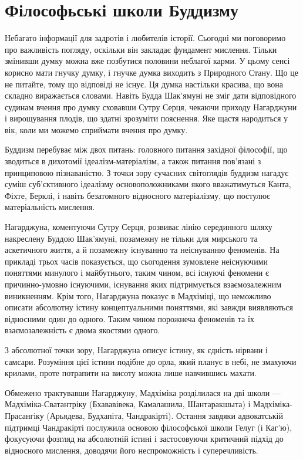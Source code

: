 \section{Філософьські школи Буддизму}

Небагато інформації для задротів і любителів історії. Сьогодні
ми поговоримо про важливість погляду, оскільки він закладає фундамент мислення.
Тільки змінивши думку можна вже позбутися половини неблагої карми.
У цьому сенсі корисно мати гнучку думку, і гнучке думка виходить з
Природного Стану. Що це не питайте, тому що відповіді не існує.
Ця думка настільки красива, що вона складно виражається словами.
Навіть Будда Шак'ямуні не зміг дати відповідного судинам вчення про думку
сховавши Сутру Серця, чекаючи приходу Нагарджуни і вирощування плодів, що здатні зрозуміти пояснення.
Яке щастя народиться у вік, коли ми можемо сприймати вчення про думку.

Буддизм перебуває між двох питань: головного питання західної філософії,
що зводиться в дихотомії ідеалізм-матеріалізм, а також питання пов'язані
з принциповою пізнаваністю. З точки зору сучасних світоглядів буддизм
нагадує суміш суб'єктивного ідеалізму основоположниками якого вважатимуться
Канта, Фіхте, Берклі, і навіть безатомного відносного матеріалізму, що постулює матеріальність мислення.

Нагарджуна, коментуючи Сутру Серця, розвиває лінію серединного шляху
накреслену Буддою Шак'ямуні, позамежну не тільки для мирського та аскетичного життя,
а й позамежну існуванню та неіснуванню феноменів. На прикладі трьох часів
показується, що сьогодення зумовлене неіснуючими поняттями минулого і майбутнього,
таким чином, всі існуючі феномени є причинно-умовно існуючими, існування яких
підтримується взаємозалежним виникненням. Крім того, Нагарджуна показує в Мадхіміці,
що неможливо описати абсолютну істину концептуальними поняттями, які завжди
виявляються відносними один до одного. Таким чином порожнеча феноменів
та їх взаємозалежність є двома якостями одного.

З абсолютної точки зору, Нагарджуна описує істину, як єдність нірвани і самсари.
Розуміння цієї істини подібне до орла, який планує в небі, не змахуючи крилами,
проте потрапити на висоту можна лише навчившись махати.

Обмежено трактувавши Нагарджуну, Мадхіміка розділилася на дві школи ---
Мадхіміка-Сватантріку (Бхававівека, Камалашила, Шантаракшыта) і Мадхіміка-Прасангіку
(Арьядева, Будхапіта, Чандракірті). Остання завдяки адвокатській підтримці Чандракірті
послужила основою філософської школи Гелуг (і Каг'ю), фокусуючи фозгляд на абсолютній
істині і застосовуючи критичний підхід до відносного мислення, доводячи його неспроможність і суперечливість.

